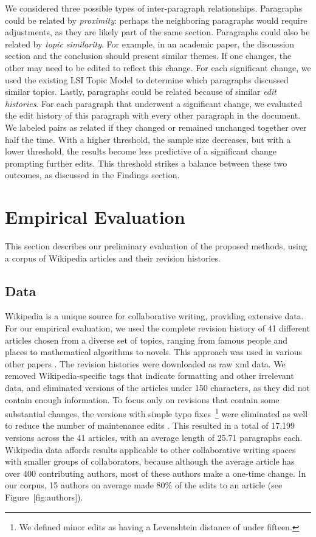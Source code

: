 We considered three possible types of inter-paragraph relationships.
Paragraphs could be related by \emph{proximity}: perhaps the neighboring
paragraphs would require adjustments, as they are likely part of the
same section. Paragraphs could also be related by \emph{topic
similarity}. For example, in an academic paper, the discussion section
and the conclusion should present similar themes. If one changes, the
other may need to be edited to reflect this change. For each significant
change, we used the existing LSI Topic Model to determine which
paragraphs discussed similar topics. Lastly, paragraphs could be related
because of similar \emph{edit histories}. For each paragraph that
underwent a significant change, we evaluated the edit history of this
paragraph with every other paragraph in the document. We labeled pairs
as related if they changed or remained unchanged together over half the
time. With a higher threshold, the sample size decreases, but with a
lower threshold, the results become less predictive of a significant
change prompting further edits. This threshold strikes a balance between
these two outcomes, as discussed in the Findings section.

\section{Empirical Evaluation}\label{empirical-evaluation}

This section describes our preliminary evaluation of the proposed
methods, using a corpus of Wikipedia articles and their revision
histories.

\subsection{Data}\label{data}

Wikipedia is a unique source for collaborative writing, providing
extensive data. For our empirical evaluation, we used the complete
revision history of 41 different articles chosen from a diverse set of
topics, ranging from famous people and places to mathematical algorithms
to novels. This approach was used in various other papers
\cite{wohner2009assessing, fong2010did}. The revision histories were
downloaded as raw xml data. We removed Wikipedia-specific tags that
indicate formatting and other irrelevant data, and eliminated versions
of the articles under 150 characters, as they did not contain enough
information. To focus only on revisions that contain some substantial
changes, the versions with simple typo fixes~\footnote{We defined minor
  edits as having a Levenshtein distance of under fifteen.} were
eliminated as well to reduce the number of maintenance edits
\cite{kittur2007he}. This resulted in a total of 17,199 versions across
the 41 articles, with an average length of 25.71 paragraphs each.
Wikipedia data affords results applicable to other collaborative writing
spaces with smaller groups of collaborators, because although the
average article has over 400 contributing authors, most of these authors
make a one-time change. In our corpus, 15 authors on average made 80\%
of the edits to an article (see Figure~{[}fig:authors{]}).

